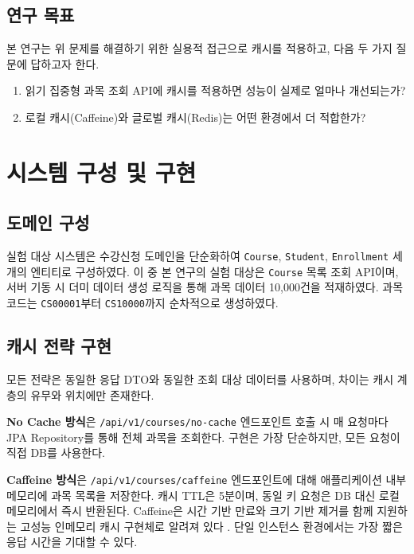 \documentclass[10pt,a4paper,twocolumn]{article}
\begin{document}
\subsection{연구 목표}

본 연구는 위 문제를 해결하기 위한 실용적 접근으로 캐시를 적용하고, 다음 두 가지 질문에 답하고자 한다.

\begin{enumerate}[leftmargin=1.4em]
    \item 읽기 집중형 과목 조회 API에 캐시를 적용하면 성능이 실제로 얼마나 개선되는가?
    \item 로컬 캐시(Caffeine)와 글로벌 캐시(Redis)는 어떤 환경에서 더 적합한가?
\end{enumerate}

\section{시스템 구성 및 구현}

\subsection{도메인 구성}

실험 대상 시스템은 수강신청 도메인을 단순화하여 \texttt{Course}, \texttt{Student}, \texttt{Enrollment} 세 개의 엔티티로 구성하였다. 이 중 본 연구의 실험 대상은 \texttt{Course} 목록 조회 API이며, 서버 기동 시 더미 데이터 생성 로직을 통해 과목 데이터 10{,}000건을 적재하였다. 과목 코드는 \texttt{CS00001}부터 \texttt{CS10000}까지 순차적으로 생성하였다.

\subsection{캐시 전략 구현}

모든 전략은 동일한 응답 DTO와 동일한 조회 대상 데이터를 사용하며, 차이는 캐시 계층의 유무와 위치에만 존재한다.

\textbf{No Cache 방식}은 \texttt{/api/v1/courses/no-cache} 엔드포인트 호출 시 매 요청마다 JPA Repository를 통해 전체 과목을 조회한다. 구현은 가장 단순하지만, 모든 요청이 직접 DB를 사용한다.

\textbf{Caffeine 방식}은 \texttt{/api/v1/courses/caffeine} 엔드포인트에 대해 애플리케이션 내부 메모리에 과목 목록을 저장한다. 캐시 TTL은 5분이며, 동일 키 요청은 DB 대신 로컬 메모리에서 즉시 반환된다. Caffeine은 시간 기반 만료와 크기 기반 제거를 함께 지원하는 고성능 인메모리 캐시 구현체로 알려져 있다 \cite{caffeine-eviction}. 단일 인스턴스 환경에서는 가장 짧은 응답 시간을 기대할 수 있다.
\end{document}
